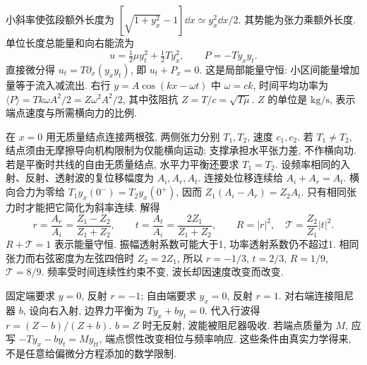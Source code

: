 小斜率使弦段额外长度为 $[\sqrt{1+y_x^2}-1]\dd x\simeq y_x^2\dd x/2$. 其势能为张力乘额外长度. 单位长度总能量和向右能流为
\begin{equation}\label{eq:flux}
u=\tfrac12\mu y_t^2+\tfrac12T y_x^2,\qquad P=-Ty_xy_t.
\end{equation}
直接微分得 $u_t=T\partial_x(y_xy_t)$, 即 $u_t+P_x=0$. 这是局部能量守恒: 小区间能量增加量等于流入减流出. 右行 $y=A\cos(kx-\omega t)$ 中 $\omega=ck$, 时间平均功率为 $\langle P\rangle=T k\omega A^2/2=Z\omega^2A^2/2$, 其中弦阻抗 $Z=T/c=\sqrt{T\mu}$. $Z$ 的单位是 $\mathrm{kg/s}$, 表示端点速度与所需横向力的比例.

在 $x=0$ 用无质量结点连接两根弦, 两侧张力分别 $T_1,T_2$, 速度 $c_1,c_2$. 若 $T_1\ne T_2$, 结点须由无摩擦导向机构限制为仅能横向运动; 支撑承担水平张力差, 不作横向功. 若是平衡时共线的自由无质量结点, 水平力平衡还要求 $T_1=T_2$. 设频率相同的入射、反射、透射波的复位移幅度为 $A_i,A_r,A_t$. 连接处位移连续给 $A_i+A_r=A_t$. 横向合力为零给 $T_1y_x(0^-)=T_2y_x(0^+)$, 因而 $Z_1(A_i-A_r)=Z_2A_t$. 只有相同张力时才能把它简化为斜率连续. 解得
\[
r=\frac{A_r}{A_i}=\frac{Z_1-Z_2}{Z_1+Z_2},\qquad
t=\frac{A_t}{A_i}=\frac{2Z_1}{Z_1+Z_2},\qquad
R=|r|^2,\quad \mathcal T=\frac{Z_2}{Z_1}|t|^2.
\]
$R+\mathcal T=1$ 表示能量守恒. 振幅透射系数可能大于1, 功率透射系数仍不超过1. 相同张力而右弦密度为左弦四倍时 $Z_2=2Z_1$, 所以 $r=-1/3$, $t=2/3$, $R=1/9$, $\mathcal T=8/9$. 频率受时间连续性约束不变, 波长却因速度改变而改变.

固定端要求 $y=0$, 反射 $r=-1$; 自由端要求 $y_x=0$, 反射 $r=1$. 对右端连接阻尼器 $b$, 设向右入射, 边界力平衡为 $Ty_x+b y_t=0$. 代入行波得 $r=(Z-b)/(Z+b)$. $b=Z$ 时无反射, 波能被阻尼器吸收. 若端点质量为 $M$, 应写 $-Ty_x-b y_t=M y_{tt}$, 端点惯性改变相位与频率响应. 这些条件由真实力学得来, 不是任意给偏微分方程添加的数学限制.
